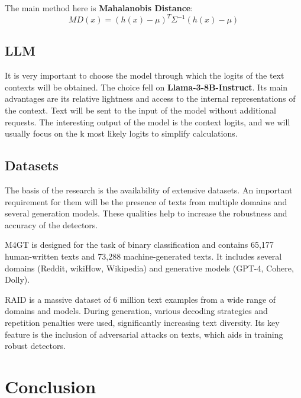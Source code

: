 \documentclass[a4paper, 12pt]{article}
\begin{document}
The main method here is \textbf{Mahalanobis Distance}:
$$MD(x) = (h(x) - \mu)^T \Sigma^{-1} (h(x) - \mu)$$

\subsection{LLM}

It is very important to choose the model through which the logits of the text contexts will be obtained. The choice fell on \textbf{Llama-3-8B-Instruct}. Its main advantages are its relative lightness and access to the internal representations of the context. Text will be sent to the input of the model without additional requests. The interesting output of the model is the context logits, and we will usually focus on the k most likely logits to simplify calculations.

\subsection{Datasets}

The basis of the research is the availability of extensive datasets. An important requirement for them will be the presence of texts from multiple domains and several generation models. These qualities help to increase the robustness and accuracy of the detectors.

M4GT\citep{wang2024m4gt} is designed for the task of binary classification and contains 65,177 human-written texts and 73,288 machine-generated texts. It includes several domains (Reddit, wikiHow, Wikipedia) and generative models (GPT-4, Cohere, Dolly).

RAID\citep{RAID} is a massive dataset of 6 million text examples from a wide range of domains and models. During generation, various decoding strategies and repetition penalties were used, significantly increasing text diversity. Its key feature is the inclusion of adversarial attacks on texts, which aids in training robust detectors.

\section{Conclusion}



\end{document}
